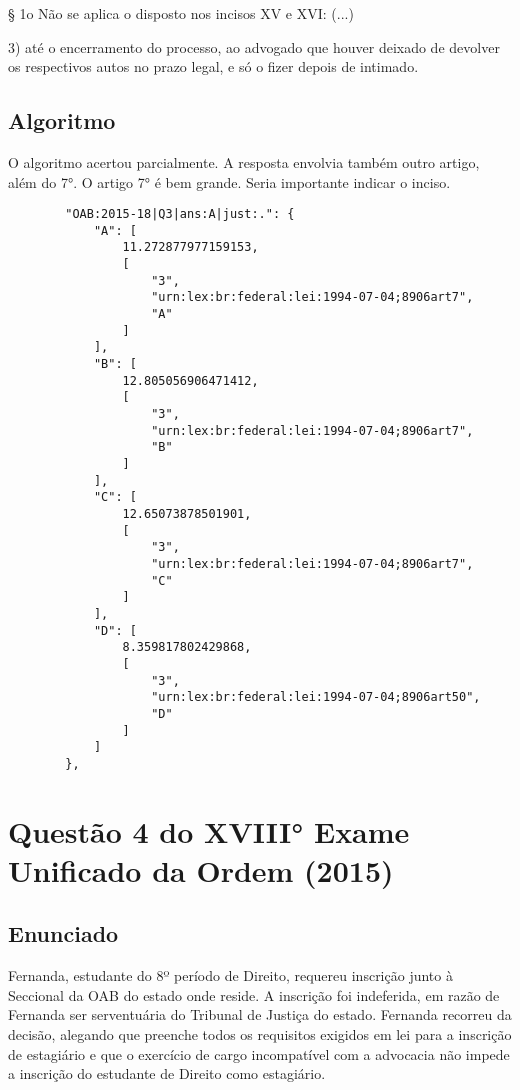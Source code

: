 \documentclass[12pt]{article}
\begin{document}
§ 1o Não se aplica o disposto nos incisos XV e XVI:
(...)

3) até o encerramento do processo, ao advogado que houver deixado de devolver os respectivos autos no prazo legal, e só o fizer depois de intimado.

\subsection{Algoritmo}

O algoritmo acertou parcialmente. A resposta envolvia também outro artigo, além do 7°. O artigo 7° é bem grande. Seria importante indicar o inciso.

\begin{lstlisting}
        "OAB:2015-18|Q3|ans:A|just:.": {
            "A": [
                11.272877977159153,
                [
                    "3",
                    "urn:lex:br:federal:lei:1994-07-04;8906art7",
                    "A"
                ]
            ],
            "B": [
                12.805056906471412,
                [
                    "3",
                    "urn:lex:br:federal:lei:1994-07-04;8906art7",
                    "B"
                ]
            ],
            "C": [
                12.65073878501901,
                [
                    "3",
                    "urn:lex:br:federal:lei:1994-07-04;8906art7",
                    "C"
                ]
            ],
            "D": [
                8.359817802429868,
                [
                    "3",
                    "urn:lex:br:federal:lei:1994-07-04;8906art50",
                    "D"
                ]
            ]
        },

\end{lstlisting}

\section{Questão 4 do XVIII° Exame Unificado da Ordem (2015)}

\subsection{Enunciado}

Fernanda, estudante do 8º período de Direito, requereu 
inscrição junto à Seccional da OAB do estado onde reside. A 
inscrição foi indeferida, em razão de Fernanda ser 
serventuária do Tribunal de Justiça do estado. Fernanda 
recorreu da decisão, alegando que preenche todos os 
requisitos exigidos em lei para a inscrição de estagiário e que o 
exercício de cargo incompatível com a advocacia não impede a 
inscrição do estudante de Direito como estagiário. 
\end{document}
